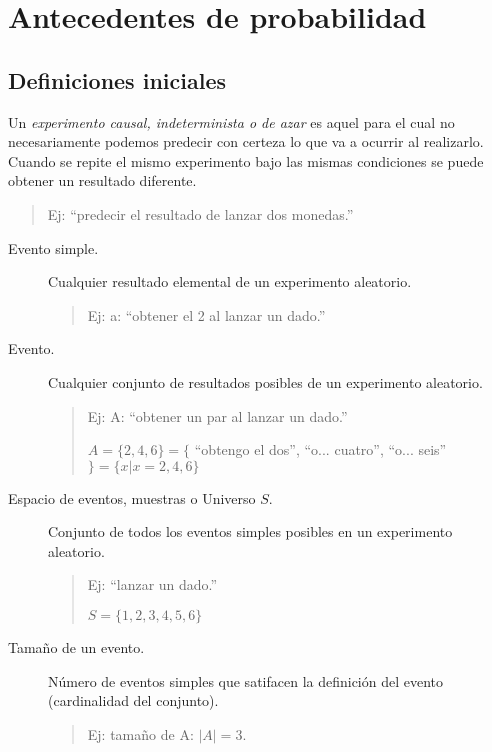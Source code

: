 \chapter{Antecedentes de probabilidad}

\section{Definiciones iniciales}

Un \emph{experimento causal, indeterminista o de azar} es aquel para el cual no necesariamente podemos predecir con certeza lo que va a ocurrir al realizarlo.  Cuando se repite el mismo experimento bajo las mismas condiciones se puede obtener un resultado diferente.
\begin{quotation}
 Ej: ``predecir el resultado de lanzar dos monedas.''
\end{quotation}

\begin{description}
 \item [Evento simple.] Cualquier resultado elemental de un experimento aleatorio.
  \begin{quotation}
   Ej: a: ``obtener el 2 al lanzar un dado.''
  \end{quotation}
  
 \item [Evento.] Cualquier conjunto de resultados posibles de un experimento aleatorio.
  \begin{quotation}
   Ej: A: ``obtener un par al lanzar un dado.''
   
       $A = \{2,4,6\} = \{$ ``obtengo el dos'', ``o... cuatro'', ``o... seis''$\} = \{x|x=2,4,6\}$
  \end{quotation}
  
 \item [Espacio de eventos, muestras o Universo $S$.]  Conjunto de todos los eventos simples posibles en un experimento aleatorio.
  \begin{quotation}
   Ej: ``lanzar un dado.''
   
       $S = \{1,2,3,4,5,6\}$
  \end{quotation}
 \item [Tamaño de un evento.] Número de eventos simples que satifacen la definición del evento (cardinalidad del conjunto).
 \begin{quotation}
  Ej: tamaño de A: $|A| = 3$.
 \end{quotation}
\end{description}

